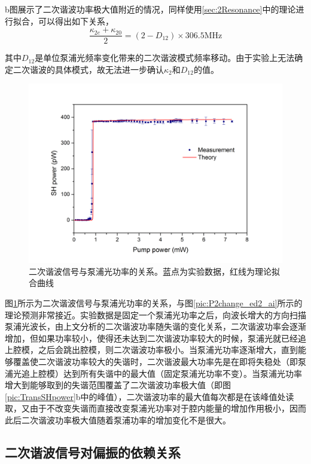 \documentclass[UTF8,a4paper,cs4size,hyperref]{ctexart}
\begin{document}
b图展示了二次谐波功率极大值附近的情况，同样使用\ref{sec:2Resonance}中的理论进行拟合，可以得出如下关系，
\begin{equation}
\frac{\kappa_{2e}+\kappa_{20}}{2} = (2-D_{12})\times 306.5\mathrm{ MHz}
\end{equation}

其中$D_{12}$是单位泵浦光频率变化带来的二次谐波模式频率移动。由于实验上无法确定二次谐波的具体模式，故无法进一步确认$\kappa_2$和$D_{12}$的值。

\begin{figure}
\centering
\includegraphics[width=14cm ]{FigSHpower-inputPw}
\caption{二次谐波信号与泵浦光功率的关系。蓝点为实验数据，红线为理论拟合曲线}
\label{pic:FigSHpower-inputPw}
\end{figure}

图\ref{pic:FigSHpower-inputPw}所示为二次谐波信号与泵浦光功率的关系，与图\ref{pic:P2change_ed2_ai}所示的理论预测非常接近。实验数据是固定一个泵浦光功率之后，向波长增大的方向扫描泵浦光波长，由上文分析的二次谐波功率随失谐的变化关系，二次谐波功率会逐渐增加，但如果功率较小，使得还未达到二次谐波功率较大的时候，泵浦光就已经追上腔模，之后会跳出腔模，则二次谐波功率极小。当泵浦光功率逐渐增大，直到能够覆盖使二次谐波功率较大的失谐时，二次谐波最大功率先是在即将失稳处（即泵浦光追上腔模）达到所有失谐中的最大值（固定泵浦光功率不变）。当泵浦光功率增大到能够取到的失谐范围覆盖了二次谐波功率极大值（即图\ref{pic:TransSHpower}b中的峰值），二次谐波功率的最大值每次都是在该峰值处读取，又由于不改变失谐而直接改变泵浦光功率对于腔内能量的增加作用极小，因而此后二次谐波功率极大值随着泵浦功率的增加变化不是很大。

\subsection{二次谐波信号对偏振的依赖关系}
\end{document}
